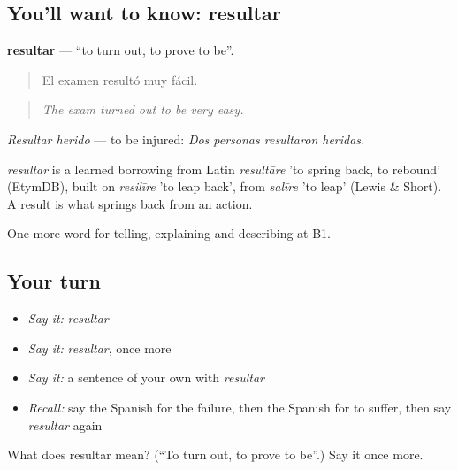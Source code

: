 \subsection*{You'll want to know: resultar}
\textbf{resultar} — \textquotedblleft{}to turn out, to prove to be\textquotedblright{}.

\begin{quote}
El examen resultó muy fácil.
\end{quote}

\begin{quote}
\emph{The exam turned out to be very easy.}
\end{quote}

\emph{Resultar herido} — to be injured: \emph{Dos personas resultaron heridas.}

\begin{cousinweb}
\emph{resultar} is a learned borrowing from Latin \emph{resultāre} 'to spring back, to rebound' (EtymDB), built on \emph{resilīre} 'to leap back', from \emph{salīre} 'to leap' (Lewis \& Short). A result is what springs back from an action.
\end{cousinweb}

\begin{grammarlens}[title={What you've built}]
One more word for telling, explaining and describing at B1.
\end{grammarlens}

\subsection*{Your turn}
\begin{itemize}
\raggedright
  \item \emph{Say it:} \emph{resultar}
  \item \emph{Say it:} \emph{resultar}, once more
  \item \emph{Say it:} a sentence of your own with \emph{resultar}
  \item \emph{Recall:} say the Spanish for the failure, then the Spanish for to suffer, then say \emph{resultar} again
\end{itemize}

\begin{tcolorbox}[breakable,colback=teal!4,colframe=teal!35!black,title={Before you move on}]
What does resultar mean? (\textquotedblleft{}To turn out, to prove to be\textquotedblright{}.) Say it once more.
\end{tcolorbox}
